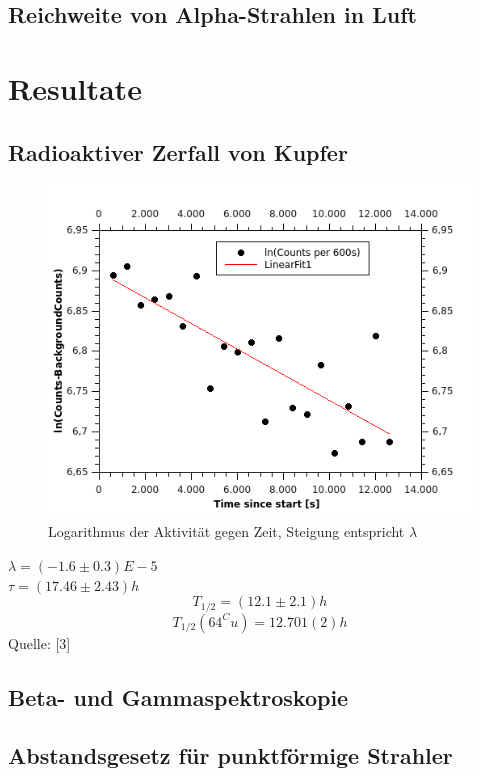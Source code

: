 \documentclass[12pt,a4paper]{article}
\begin{document}
\begin{multicols}{2}
\subsection{Reichweite von Alpha-Strahlen in Luft}


\pagebreak
\section{Resultate}
\subsection{Radioaktiver Zerfall von Kupfer}
\begin{figure}[H]
	\centering
	\includegraphics[scale=1.5]{./figures/kupfer_zerfall_ergebnis.png}
	\caption{Logarithmus der Aktivität gegen Zeit, Steigung entspricht $\lambda$}
	\label{fig:kupferzerfall_erg}
\end{figure}
 $\lambda = (-1.6 \pm 0.3) E-5$\\
 $\tau = (17.46 \pm 2.43)h$\\
 $$T_{1/2} = (12.1 \pm 2.1)h$$
 $$T_{1/2} ({64}^Cu) = 12.701(2) h$$
 Quelle: [3]
\subsection{Beta- und Gammaspektroskopie}

\subsection{Abstandsgesetz für punktförmige Strahler}


\end{multicols}
\end{document}
